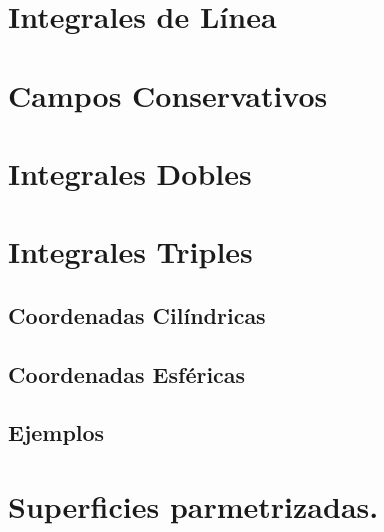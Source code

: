 \documentclass[10pt, a4paper]{report}
\begin{document}
                
         \section{Integrales de L\'inea}
            
              
         
              
      
     \section{Campos Conservativos}
          
   
  
           
   
     
   

  
         \section{Integrales Dobles} 
          
       
     
       
       \section{Integrales Triples}
        
        \subsection{Coordenadas Cilíndricas}
        
        \subsection{Coordenadas Esféricas}
        
        \subsection{Ejemplos}
        
        
        
        
  
  
      \section{Superficies parmetrizadas.}
           
           
\end{document}
